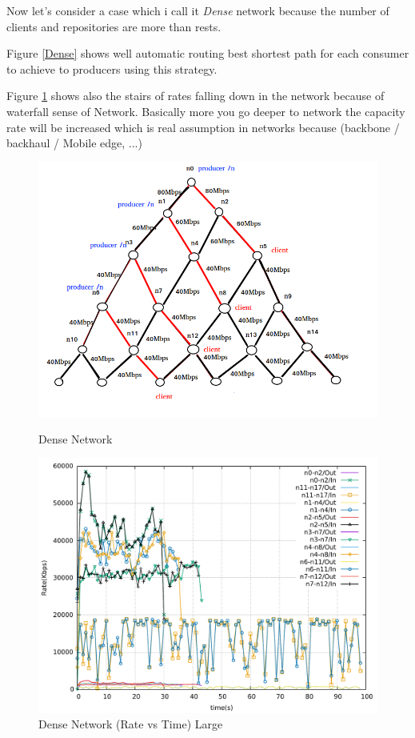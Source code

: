 Now let's consider a case which i call it \textit{Dense} network because the number of clients and repositories are more than rests.

Figure \ref{Dense} shows well automatic routing best shortest path for each consumer to achieve to producers using this strategy.

Figure \ref{dense} shows also the stairs of rates falling down in the network because of waterfall sense of Network. Basically more you go deeper to network the capacity rate will be increased which is real assumption in networks because (backbone / backhaul / Mobile edge, ...)
\begin{figure}[H]

\begin{center}


\includegraphics[scale = 0.4]{Figures/dense.png}

\caption{Dense Network} \label{Dense} 

\includegraphics[scale = 0.4]{Figures/dense.pdf}

\caption{Dense Network (Rate vs Time) Large} \label{dense} 


\end{center}

\end{figure}
